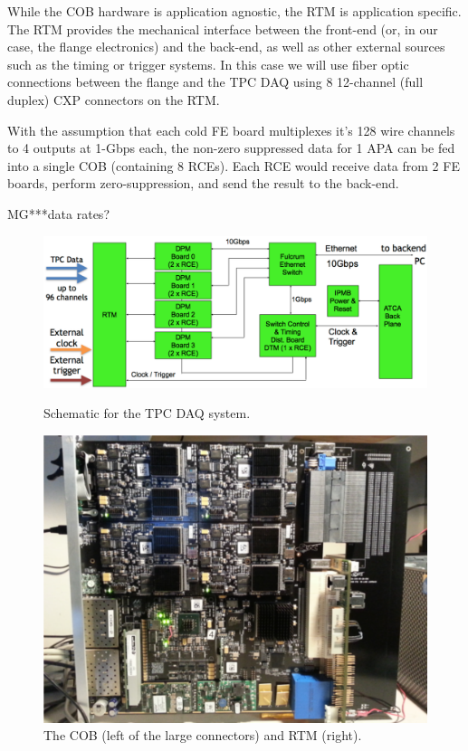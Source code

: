 While the COB hardware is application agnostic,  the RTM is application specific. The RTM provides the mechanical interface between the front-end (or, in our case, the flange electronics) and the back-end, as well as other external sources such as the timing or trigger systems.  In this case we will use fiber optic connections between the flange and the TPC DAQ using 8 12-channel (full duplex) CXP connectors on the RTM. 

With the assumption that each cold FE board multiplexes it's 128 wire channels to 4 outputs at 1-Gbps each, the non-zero suppressed data for 1 APA can be fed into a single COB (containing 8 RCEs).  Each RCE would receive data from 2 FE boards, perform zero-suppression, and send the result to the back-end.  

MG***data rates?  

\begin{figure}[tb]
  \centering
\includegraphics[scale=0.4]{figures/rce-block.pdf}
\label{fig:rceblock}
  \caption{Schematic for the TPC DAQ system.   }
\end{figure}


\begin{figure}[hbt]
  \includegraphics[scale=0.6]{figures/COB-gen3.pdf}
  \caption{\label{fig:cob} The COB (left of the large connectors) and RTM (right).  }
\end{figure}




